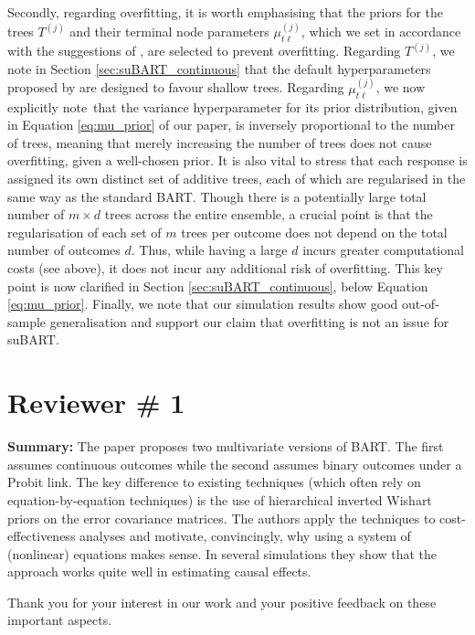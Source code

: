 \documentclass{article}
\begin{document}
Secondly, regarding overfitting, it is worth emphasising that the priors for the trees $T^{(j)}$ and their terminal node parameters $\mu^{(j)}_{t\ell}$, which we set in accordance with the suggestions of \citet{chipman2010bart}, are selected to prevent overfitting. Regarding $T^{(j)}$, we note in Section \ref{sec:suBART_continuous} that the default hyperparameters proposed by \citet{chipman2010bart} are designed to favour shallow trees. Regarding $\mu^{(j)}_{t\ell}$, we now explicitly note~that the variance hyperparameter for its prior distribution, given in Equation \eqref{eq:mu_prior} of our paper, is inversely proportional to the number of trees, meaning that merely increasing the number of trees does not cause overfitting, given a well-chosen prior. It is also vital to stress that each response is assigned its own distinct set of additive trees, each of which are regularised in the same way as the standard BART. Though there is a potentially large total number of $m\times d$ trees across the entire ensemble, a crucial point is that the regularisation of each set of $m$ trees per outcome does not depend on the total number of outcomes $d$. Thus, while having a large $d$ incurs greater computational costs (see above), it does not incur any additional risk of overfitting. This key point is now clarified in Section \ref{sec:suBART_continuous}, below Equation \eqref{eq:mu_prior}. Finally, we note that our simulation results show good out-of-sample generalisation and support our claim that overfitting is not an issue for suBART.

\section{Reviewer \# 1}

\begin{mdframed}
    \textbf{Summary:} The paper proposes two multivariate versions of BART. The first assumes continuous outcomes while the second assumes binary outcomes under a Probit link. The key difference to existing techniques (which often rely on equation-by-equation techniques) is the use of hierarchical inverted Wishart priors on the error covariance matrices. The authors apply the techniques to cost-effectiveness analyses and motivate, convincingly, why using a system of (nonlinear) equations makes sense. In several simulations they show that the approach works quite well in estimating causal effects.
\end{mdframed}

Thank you for your interest in our work and your positive feedback on these important aspects.
\end{document}
